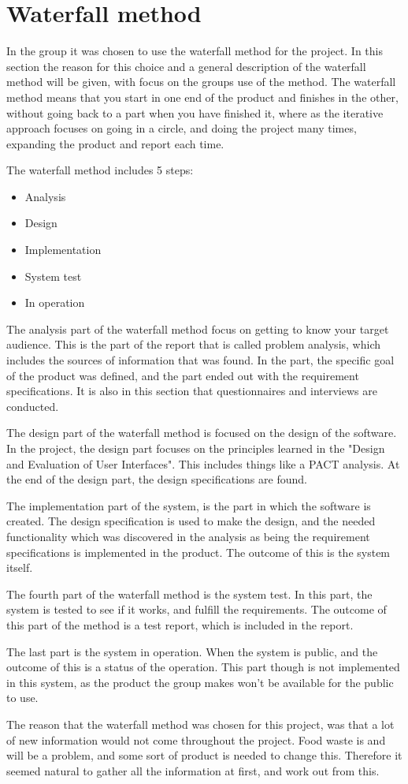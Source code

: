 \section{Waterfall method}

In the group it was chosen to use the waterfall method for the project. In this section the reason for this choice and a general description of the waterfall method will be given, with focus on the groups use of the method. The waterfall method means that you start in one end of the product and finishes in the other, without going back to a part when you have finished it, where as the iterative approach focuses on going in a circle, and doing the project many times, expanding the product and report each time.

The waterfall method includes 5 steps:

\begin{itemize}
	\item Analysis
	\item Design
	\item Implementation
	\item System test
	\item In operation
\end{itemize}

The analysis part of the waterfall method focus on getting to know your target audience. This is the part of the report that is called problem analysis, which includes the sources of information that was found. In the part, the specific goal of the product was defined, and the part ended out with the requirement specifications. It is also in this section that questionnaires and interviews are conducted.

The design part of the waterfall method is focused on the design of the software. In the project, the design part focuses on the principles learned in the "Design and Evaluation of User Interfaces". This includes things like a PACT analysis. At the end of the design part, the design specifications are found.

The implementation part of the system, is the part in which the software is created. The design specification is used to make the design, and the needed functionality which was discovered in the analysis as being the requirement specifications is implemented in the product. The outcome of this is the system itself.

The fourth part of the waterfall method is the system test. In this part, the system is tested to see if it works, and fulfill the requirements. The outcome of this part of the method is a test report, which is included in the report.

The last part is the system in operation. When the system is public, and the outcome of this is a status of the operation. This part though is not implemented in this system, as the product the group makes won't be available for the public to use.

The reason that the waterfall method was chosen for this project, was that a lot of new information would not come throughout the project. Food waste is and will be a problem, and some sort of product is needed to change this. Therefore it seemed natural to gather all the information at first, and work out from this.